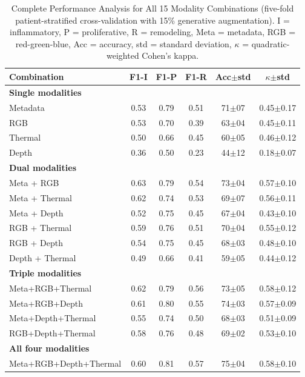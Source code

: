 \documentclass[journal,twoside,web]{ieeecolor}
\begin{document}
\begin{table}[H]
\renewcommand{\arraystretch}{1.15}
\caption{Complete Performance Analysis for All 15 Modality Combinations (five-fold patient-stratified cross-validation with 15\% generative augmentation). I = inflammatory, P = proliferative, R = remodeling, Meta = metadata, RGB = red-green-blue, Acc = accuracy, std = standard deviation, $\kappa$ = quadratic-weighted Cohen's kappa.}
\label{tab:supplementary_all_combos}
\centering
\footnotesize
\begin{tabular}{|l|c|c|c|c|c|}
\hline
\textbf{Combination} & \textbf{F1-I} & \textbf{F1-P} & \textbf{F1-R} & \textbf{Acc$\pm$std} & \textbf{$\kappa$$\pm$std} \\
\hline
\multicolumn{6}{|l|}{\textbf{Single modalities}} \\
\hline
Metadata & 0.53 & 0.79 & 0.51 & 71$\pm$07 & 0.45$\pm$0.17 \\
RGB & 0.53 & 0.70 & 0.39 & 63$\pm$04 & 0.45$\pm$0.11 \\
Thermal & 0.50 & 0.66 & 0.45 & 60$\pm$05 & 0.46$\pm$0.12 \\
Depth & 0.36 & 0.50 & 0.23 & 44$\pm$12 & 0.18$\pm$0.07 \\
\hline
\multicolumn{6}{|l|}{\textbf{Dual modalities}} \\
\hline
Meta + RGB & 0.63 & 0.79 & 0.54 & 73$\pm$04 & 0.57$\pm$0.10 \\
Meta + Thermal & 0.62 & 0.74 & 0.53 & 69$\pm$07 & 0.56$\pm$0.11 \\
Meta + Depth & 0.52 & 0.75 & 0.45 & 67$\pm$04 & 0.43$\pm$0.10 \\
RGB + Thermal & 0.59 & 0.76 & 0.51 & 70$\pm$04 & 0.55$\pm$0.12 \\
RGB + Depth & 0.54 & 0.75 & 0.45 & 68$\pm$03 & 0.48$\pm$0.10 \\
Depth + Thermal & 0.49 & 0.66 & 0.41 & 59$\pm$05 & 0.44$\pm$0.12 \\
\hline
\multicolumn{6}{|l|}{\textbf{Triple modalities}} \\
\hline
Meta+RGB+Thermal & 0.62 & 0.79 & 0.56 & 73$\pm$05 & 0.58$\pm$0.12 \\
Meta+RGB+Depth & 0.61 & 0.80 & 0.55 & 74$\pm$03 & 0.57$\pm$0.09 \\
Meta+Depth+Thermal & 0.55 & 0.74 & 0.50 & 68$\pm$03 & 0.51$\pm$0.09 \\
RGB+Depth+Thermal & 0.58 & 0.76 & 0.48 & 69$\pm$02 & 0.53$\pm$0.10 \\
\hline
\multicolumn{6}{|l|}{\textbf{All four modalities}} \\
\hline
Meta+RGB+Depth+Thermal & 0.60 & 0.81 & 0.57 & 75$\pm$04 & 0.58$\pm$0.10 \\
\hline
\end{tabular}
\end{table}
\end{document}
